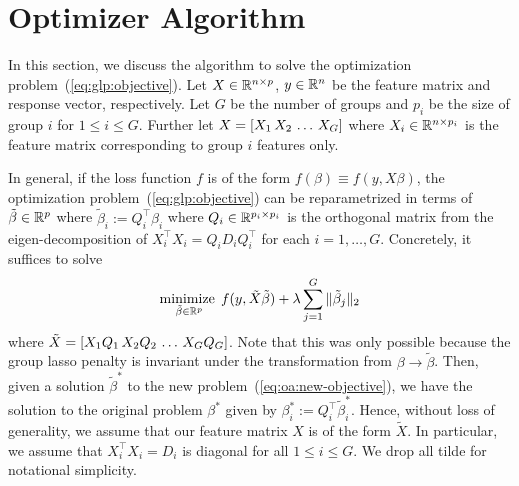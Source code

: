 \section{Optimizer Algorithm}

In this section, we discuss the algorithm to solve the optimization problem~(\ref{eq:glp:objective}).
Let $X \in \mathbb{R}^{n\times p}$, $y\in \mathbb{R}^n$ be the feature matrix and response vector, respectively.
Let $G$ be the number of groups and $p_i$ be the size of group $i$ for $1\leq i\leq G$.
Further let $X = \left[X_1 \, X_2 \, \ldots \, X_G\right]$ where $X_i \in \mathbb{R}^{n \times p_i}$ is the feature matrix
corresponding to group $i$ features only.

In general, if the loss function $f$ is of the form $f(\beta) \equiv f(y, X\beta)$,
the optimization problem~(\ref{eq:glp:objective}) can be reparametrized
in terms of $\tilde{\beta} \in \mathbb{R}^p$ where $\tilde{\beta}_i := Q_i^\top \beta_i$
where $Q_i \in \mathbb{R}^{p_i \times p_i}$ is the orthogonal matrix from the eigen-decomposition of 
$X_i^\top X_i = Q_i D_i Q_i^\top$ for each $i=1,\ldots, G$.
Concretely, it suffices to solve
\begin{align}
    \operatorname*{minimize\;}_{\tilde{\beta} \in \mathbb{R}^p}
    f(y, \tilde{X} \tilde{\beta})
    + \lambda \sum\limits_{j=1}^G \|\tilde{\beta}_j\|_2
    \label{eq:oa:new-objective}
\end{align}
where $\tilde{X} = \left[X_1 Q_1 \, X_2 Q_2 \, \ldots \, X_G Q_G\right]$.
Note that this was only possible because the group lasso penalty is invariant under
the transformation from $\beta \to \tilde{\beta}$.
Then, given a solution $\tilde{\beta}^*$ to the new problem~(\ref{eq:oa:new-objective}),
we have the solution to the original problem $\beta^*$ given by
$\beta^*_i := Q_i^\top \tilde{\beta}_i^*$.
Hence, without loss of generality, we assume that 
our feature matrix $X$ is of the form $\tilde{X}$.
In particular, we assume that $X_i^\top X_i = D_i$ is diagonal for all $1\leq i\leq G$.
We drop all tilde for notational simplicity.


